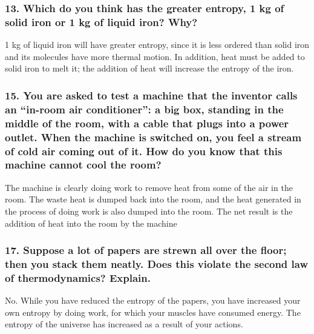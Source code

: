 \documentclass{article}
\begin{document}
\subsubsection*{
    13. Which do you think has the greater entropy, 
    1 kg of solid iron or 1 kg of liquid iron? Why?
}
1 kg of liquid iron will have greater entropy, since it is less ordered than
  solid iron and its molecules have more thermal motion. In addition, heat must
  be added to solid iron to melt it; the addition of heat will increase the
  entropy of the iron. 
\subsubsection*{
    15. You are asked to test a machine that the inventor
    calls an “in-room air conditioner”: a big box, standing 
    in the middle of the room, with a cable that plugs into a
    power outlet. When the machine is switched on, you feel a
    stream of cold air coming out of it. How do you know that this machine cannot cool the room?
}
The machine is clearly doing work to remove heat from some of the air in the
room. The waste heat is dumped back into the room, and the heat generated in the
process of doing work is also dumped into the room. The net result is the
addition of heat into the room by the machine 
\subsubsection*{
    17. Suppose a lot of papers are strewn all over the floor;
    then you stack them neatly. Does this violate the second law of thermodynamics? Explain.
}
No. While you have reduced the entropy of the papers, you have increased your
own entropy by doing work, for which your muscles have consumed energy. The
entropy of the universe has increased as a result of your actions. 
\end{document}
